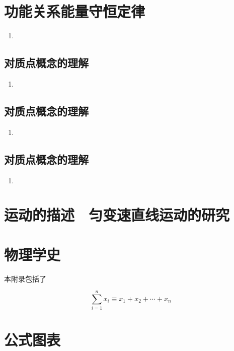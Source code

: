 \documentclass[cn,11pt]{elegantbook}
\begin{document}
\chapter{功能关系能量守恒定律}
\begin{enumerate}
   \item 
\end{enumerate}

\section{对质点概念的理解}
\begin{enumerate}
   \item 
\end{enumerate}

\section{对质点概念的理解}
\begin{enumerate}
   \item 
\end{enumerate}

\section{对质点概念的理解}
\begin{enumerate}
   \item 
\end{enumerate}


\chapter{运动的描述　匀变速直线运动的研究}

\nocite{*} 



\appendix
\chapter{物理学史}

本附录包括了

\begin{equation}
\sum_{i=1}^n x_i \equiv x_1 + x_2 +\cdots + x_n
\end{equation}



\chapter{公式图表}
\end{document}

